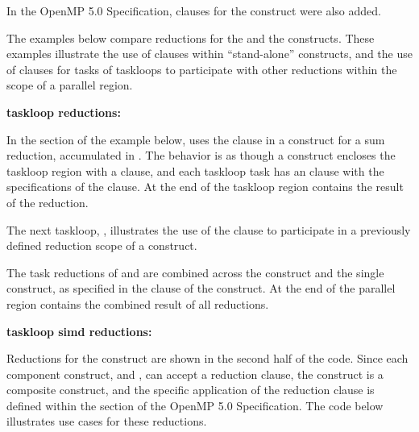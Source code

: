 
In the OpenMP 5.0 Specification,  clauses for the
 construct were also added. 

The examples below compare reductions for the  and the  constructs.
These examples illustrate the use of  clauses within 
``stand-alone''  constructs, and the use of  clauses for tasks of taskloops to participate
with other reductions within the scope of a parallel region.

\textbf{taskloop reductions:}

In the  section of the example below, 
 uses the  clause 
in a  construct for a sum reduction, accumulated in . 
The behavior is as though a  construct encloses the 
taskloop region with a  clause, and each taskloop
task has an  clause with the specifications 
of the  clause.
At the end of the taskloop region  contains the result of the reduction.

The next taskloop, , illustrates the use of the 
 clause to participate in a previously defined
reduction scope of a  construct.

The task reductions of  and  are combined
across the  construct and the single  construct, as specified
in the  clause of the  construct.
At the end of the parallel region  contains the combined result of all reductions.

\textbf{taskloop simd reductions:}

Reductions for the  construct are shown in the second half of the code.
Since each component construct,  and , 
can accept a reduction clause, the  construct
is a composite construct, and the specific application of the reduction clause is defined
within the  section of the OpenMP 5.0 Specification.
The code below illustrates use cases for these reductions.

